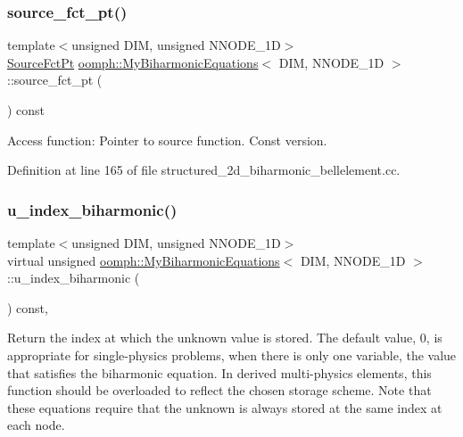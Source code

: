 \subsubsection{\texorpdfstring{source\+\_\+fct\+\_\+pt()}{source\_fct\_pt()}\hspace{0.1cm}{\footnotesize\ttfamily [2/2]}}
{\footnotesize\ttfamily template$<$unsigned D\+IM, unsigned N\+N\+O\+D\+E\+\_\+1D$>$ \\
\hyperlink{classoomph_1_1MyBiharmonicEquations_a17bd58054c66229016eb1c52eab36bc1}{Source\+Fct\+Pt} \hyperlink{classoomph_1_1MyBiharmonicEquations}{oomph\+::\+My\+Biharmonic\+Equations}$<$ D\+IM, N\+N\+O\+D\+E\+\_\+1D $>$\+::source\+\_\+fct\+\_\+pt (\begin{DoxyParamCaption}{ }\end{DoxyParamCaption}) const\hspace{0.3cm}{\ttfamily [inline]}}



Access function\+: Pointer to source function. Const version. 



Definition at line 165 of file structured\+\_\+2d\+\_\+biharmonic\+\_\+bellelement.\+cc.

\mbox{\label{classoomph_1_1MyBiharmonicEquations_aecad5ed2e1534519b81e778c5dff6457}} 
\subsubsection{\texorpdfstring{u\+\_\+index\+\_\+biharmonic()}{u\_index\_biharmonic()}}
{\footnotesize\ttfamily template$<$unsigned D\+IM, unsigned N\+N\+O\+D\+E\+\_\+1D$>$ \\
virtual unsigned \hyperlink{classoomph_1_1MyBiharmonicEquations}{oomph\+::\+My\+Biharmonic\+Equations}$<$ D\+IM, N\+N\+O\+D\+E\+\_\+1D $>$\+::u\+\_\+index\+\_\+biharmonic (\begin{DoxyParamCaption}{ }\end{DoxyParamCaption}) const\hspace{0.3cm}{\ttfamily [inline]}, {\ttfamily [virtual]}}



Return the index at which the unknown value is stored. The default value, 0, is appropriate for single-\/physics problems, when there is only one variable, the value that satisfies the biharmonic equation. In derived multi-\/physics elements, this function should be overloaded to reflect the chosen storage scheme. Note that these equations require that the unknown is always stored at the same index at each node. 



